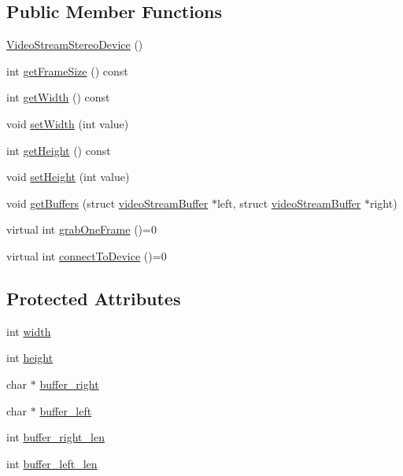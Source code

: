 \subsection*{Public Member Functions}
\begin{DoxyCompactItemize}
\item 
\hyperlink{classVideoStreamStereoDevice_a6ff6603f94f44f7dac28de4ac195a18c}{Video\+Stream\+Stereo\+Device} ()
\item 
int \hyperlink{classVideoStreamStereoDevice_ab298f30a6339e8729d95b58fec0fdd42}{get\+Frame\+Size} () const 
\item 
int \hyperlink{classVideoStreamStereoDevice_a17527e897d16e363003d37c74b390e33}{get\+Width} () const 
\item 
void \hyperlink{classVideoStreamStereoDevice_a3104086b06532035588bb8d424f15738}{set\+Width} (int value)
\item 
int \hyperlink{classVideoStreamStereoDevice_aa0410bfdaf9467a24e4d25fdbe7062d8}{get\+Height} () const 
\item 
void \hyperlink{classVideoStreamStereoDevice_a536021533e1e4cb678338a961b095429}{set\+Height} (int value)
\item 
void \hyperlink{classVideoStreamStereoDevice_afee2d316610727d829ed75b7fe51a777}{get\+Buffers} (struct \hyperlink{structvideoStreamBuffer}{video\+Stream\+Buffer} $\ast$left, struct \hyperlink{structvideoStreamBuffer}{video\+Stream\+Buffer} $\ast$right)
\item 
virtual int \hyperlink{classVideoStreamStereoDevice_a98ac1bfc13c0d700ee8f4658485e0d39}{grab\+One\+Frame} ()=0
\item 
virtual int \hyperlink{classVideoStreamStereoDevice_aa85f8836979a061a7f11d0e3ca0f9c44}{connect\+To\+Device} ()=0
\end{DoxyCompactItemize}
\subsection*{Protected Attributes}
\begin{DoxyCompactItemize}
\item 
int \hyperlink{classVideoStreamStereoDevice_a87596748c13021a3623bb55de4c9be14}{width}
\item 
int \hyperlink{classVideoStreamStereoDevice_a97af0c098374ce089e71d9020b792f1f}{height}
\item 
char $\ast$ \hyperlink{classVideoStreamStereoDevice_a1d854ebc4900384b76163e1cd738cd98}{buffer\+\_\+right}
\item 
char $\ast$ \hyperlink{classVideoStreamStereoDevice_a80c9ca761c34011dc5dc90d629df3f15}{buffer\+\_\+left}
\item 
int \hyperlink{classVideoStreamStereoDevice_a7b8a59b76b5763b67cb357171c9396d7}{buffer\+\_\+right\+\_\+len}
\item 
int \hyperlink{classVideoStreamStereoDevice_a0ae10b0a0bc18b5f3899954c67347c61}{buffer\+\_\+left\+\_\+len}
\end{DoxyCompactItemize}


